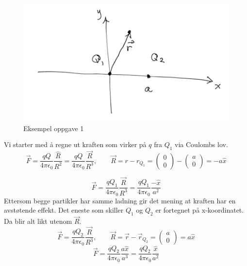     \begin{figure}[ht!]
      \centering
      \includegraphics[scale = .7]{Bilder/Eksempel_Krefter_paa_ladning.png}
      \caption{Eksempel oppgave 1}
      \label{fig:EksempelOppgave1}
    \end{figure}
  
  Vi starter med å regne ut kraften som virker på $ q $ fra $ Q_1 $ via Coulombs lov.
  \[
  \vec{F} = \frac{qQ }{4 π \epsilon_0} \frac{\hat{R}}{R^{2}} = \frac{qQ }{4 π \epsilon_0} \frac{\vec{R}}{R^{3}}, \qquad \vec{R} = r - r_{Q_{1}} =   \begin{pmatrix}
       0  \\ 
       0 
    \end{pmatrix} - 
      \begin{pmatrix}
         a  \\ 
         0 
      \end{pmatrix} = 
  - a \hat{x}
  \]
    
  \[
  \vec{F} = \frac{qQ_1 }{4 π \epsilon_0} \frac{\vec{R}}{R^{3}} = \frac{qQ_1 }{4 π \epsilon_0} \frac{- \hat{x}}{a^{2}}
  \]
  Ettersom begge partikler har samme ladning gir det mening at kraften har en avstøtende effekt. Det eneste som skiller $ Q_1 $ og $ Q_2 $ er fortegnet på x-koordinatet. Da blir alt likt utenom $ \vec{R} $.
  \[
  \vec{F} = \frac{qQ_2 }{4 π \epsilon_0} \frac{\vec{R}}{R^{3}}, \qquad \vec{R} = \vec{r} - \vec{r}_{Q_2} = 
    \begin{pmatrix}
       a  \\ 
       0 
    \end{pmatrix} = a \hat{x}
  \]
  \[
  \vec{F} = \frac{qQ_2 }{4 π \epsilon_0} \frac{a \hat{x}}{a^{3}} = \frac{qQ_2 }{4 π \epsilon_0} \frac{\hat{x}}{a^{2}}
  \]
  \newpage
